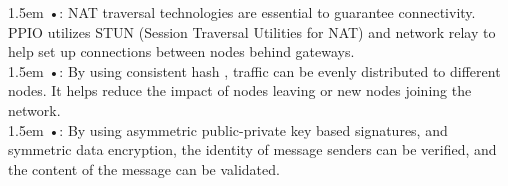 \documentclass[10pt,a4paper]{article}
\begin{document}
\hangindent 1.5em
\noindent   
•: NAT traversal technologies are essential to guarantee connectivity. PPIO utilizes STUN (Session Traversal Utilities for NAT) and network relay to help set up connections between nodes behind gateways.
\vspace{-0.8em}
\\

\hangindent 1.5em
\noindent   
•: By using consistent hash \cite{article11}, traffic can be evenly distributed to different nodes. It helps reduce the impact of nodes leaving or new nodes joining the network.
\vspace{-0.8em}
\\

\hangindent 1.5em
\noindent   
•: By using asymmetric public-private key based signatures, and symmetric data encryption, the identity of message senders can be verified, and the content of the message can be validated.
\vspace{-0.5em}
\end{document}
